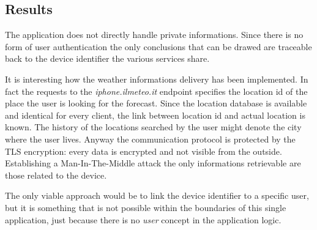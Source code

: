 		\subsection{Results}
			\par The application does not directly handle private informations. Since there is no form of user authentication the only conclusions that can be drawed are traceable back to the device identifier the various services share. \newline
			\par It is interesting how the weather informations delivery has been implemented. In fact the requests to the \textit{iphone.ilmeteo.it} endpoint specifies the location id of the place the user is looking for the forecast. Since the location database is available and identical for every client, the link between location id and actual location is known. The history of the locations searched by the user might denote the city where the user lives. Anyway the communication protocol is protected by the TLS encryption: every data is encrypted and not visible from the outside. Establishing a Man-In-The-Middle attack the only informations retrievable are those related to the device. \newline
			\par The only viable approach would be to link the device identifier to a specific user, but it is something that is not possible within the boundaries of this single application, just because there is no \textit{user} concept in the application logic.
			
			\newpage
			